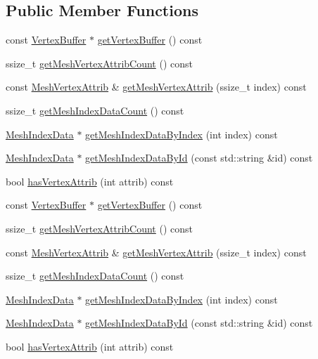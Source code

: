 \subsection*{Public Member Functions}
\begin{DoxyCompactItemize}
\item 
const \hyperlink{classVertexBuffer}{Vertex\+Buffer} $\ast$ \hyperlink{classMeshVertexData_aaf55681103d18dbf53f36a95d0c14531}{get\+Vertex\+Buffer} () const
\item 
ssize\+\_\+t \hyperlink{classMeshVertexData_afc91302bc86ac2ea764d76f16fe5a8fe}{get\+Mesh\+Vertex\+Attrib\+Count} () const
\item 
const \hyperlink{structMeshVertexAttrib}{Mesh\+Vertex\+Attrib} \& \hyperlink{classMeshVertexData_a6ada4b01fcfbd383989719fb4648e2fa}{get\+Mesh\+Vertex\+Attrib} (ssize\+\_\+t index) const
\item 
ssize\+\_\+t \hyperlink{classMeshVertexData_ab63dd57bce3efef6120b3678e69606e1}{get\+Mesh\+Index\+Data\+Count} () const
\item 
\hyperlink{classMeshIndexData}{Mesh\+Index\+Data} $\ast$ \hyperlink{classMeshVertexData_a34af004d8832cc7ae74a5a558c5c3465}{get\+Mesh\+Index\+Data\+By\+Index} (int index) const
\item 
\hyperlink{classMeshIndexData}{Mesh\+Index\+Data} $\ast$ \hyperlink{classMeshVertexData_ab0b4a51e3cf6bdf54da43fbfb262b361}{get\+Mesh\+Index\+Data\+By\+Id} (const std\+::string \&id) const
\item 
bool \hyperlink{classMeshVertexData_a8b2f51bd2ff3d9fab32fd1ec1ab54264}{has\+Vertex\+Attrib} (int attrib) const
\item 
const \hyperlink{classVertexBuffer}{Vertex\+Buffer} $\ast$ \hyperlink{classMeshVertexData_aaf55681103d18dbf53f36a95d0c14531}{get\+Vertex\+Buffer} () const
\item 
ssize\+\_\+t \hyperlink{classMeshVertexData_afc91302bc86ac2ea764d76f16fe5a8fe}{get\+Mesh\+Vertex\+Attrib\+Count} () const
\item 
const \hyperlink{structMeshVertexAttrib}{Mesh\+Vertex\+Attrib} \& \hyperlink{classMeshVertexData_a6ada4b01fcfbd383989719fb4648e2fa}{get\+Mesh\+Vertex\+Attrib} (ssize\+\_\+t index) const
\item 
ssize\+\_\+t \hyperlink{classMeshVertexData_ab63dd57bce3efef6120b3678e69606e1}{get\+Mesh\+Index\+Data\+Count} () const
\item 
\hyperlink{classMeshIndexData}{Mesh\+Index\+Data} $\ast$ \hyperlink{classMeshVertexData_a34af004d8832cc7ae74a5a558c5c3465}{get\+Mesh\+Index\+Data\+By\+Index} (int index) const
\item 
\hyperlink{classMeshIndexData}{Mesh\+Index\+Data} $\ast$ \hyperlink{classMeshVertexData_a73bb24292e7c0f2138250cfabec91ee1}{get\+Mesh\+Index\+Data\+By\+Id} (const std\+::string \&id) const
\item 
bool \hyperlink{classMeshVertexData_a8b2f51bd2ff3d9fab32fd1ec1ab54264}{has\+Vertex\+Attrib} (int attrib) const
\end{DoxyCompactItemize}
